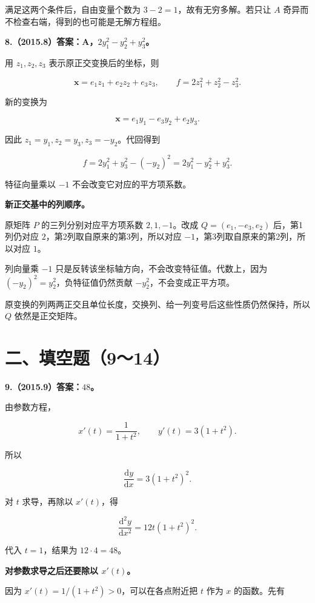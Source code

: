 \documentclass[UTF8,11pt,fontset=windows]{ctexart}
\begin{document}
满足这两个条件后，自由变量个数为 $3-2=1$，故有无穷多解。若只让 $A$ 奇异而不检查右端，得到的也可能是无解方程组。

\clearpage

\textbf{8.（2015.8）答案：A，$2y_1^2-y_2^2+y_3^2$。}

用 $z_1,z_2,z_3$ 表示原正交变换后的坐标，则

$$
\boldsymbol x=e_1z_1+e_2z_2+e_3z_3,
\qquad f=2z_1^2+z_2^2-z_3^2.
$$

新的变换为

$$
\boldsymbol x=e_1y_1-e_3y_2+e_2y_3.
$$

因此 $z_1=y_1,z_2=y_3,z_3=-y_2$。代回得到

$$
f=2y_1^2+y_3^2-(-y_2)^2
=2y_1^2-y_2^2+y_3^2.
$$

特征向量乘以 $-1$ 不会改变它对应的平方项系数。

\textbf{新正交基中的列顺序。}

原矩阵 $P$ 的三列分别对应平方项系数 $2,1,-1$。改成 $Q=(e_1,-e_3,e_2)$ 后，第1列仍对应 $2$，第2列取自原来的第3列，所以对应 $-1$，第3列取自原来的第2列，所以对应 $1$。

列向量乘 $-1$ 只是反转该坐标轴方向，不会改变特征值。代数上，因为 $(-y_2)^2=y_2^2$，负特征值仍然贡献 $-y_2^2$，不会变成正平方项。

原变换的列两两正交且单位长度，交换列、给一列变号后这些性质仍然保持，所以 $Q$ 依然是正交矩阵。

\clearpage

\section*{二、填空题（9～14）}

\textbf{9.（2015.9）答案：$48$。}

由参数方程，

$$
x'(t)=\frac1{1+t^2},\qquad y'(t)=3(1+t^2).
$$

所以

$$
\frac{\mathrm dy}{\mathrm dx}=3(1+t^2)^2.
$$

对 $t$ 求导，再除以 $x'(t)$，得

$$
\frac{\mathrm d^2y}{\mathrm dx^2}
=12t(1+t^2)^2.
$$

代入 $t=1$，结果为 $12\cdot4=48$。

\textbf{对参数求导之后还要除以 $x'(t)$。}

因为 $x'(t)=1/(1+t^2)>0$，可以在各点附近把 $t$ 作为 $x$ 的函数。先有
\end{document}
